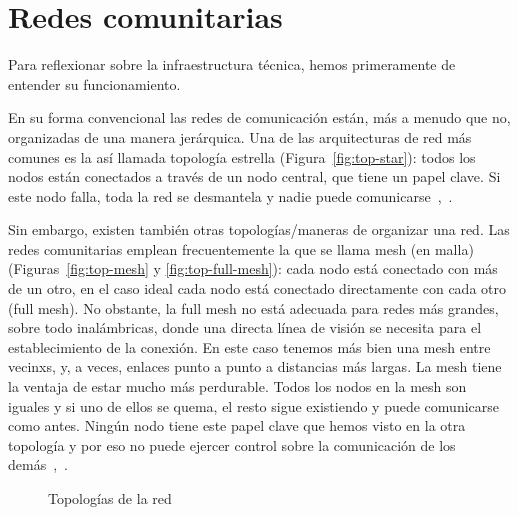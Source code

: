 \section{Redes comunitarias}
\label{cap:redes}

Para reflexionar sobre la infraestructura técnica, hemos primeramente de entender su funcionamiento.

En su forma convencional las redes de comunicación están, más a menudo que no, organizadas de una manera jerárquica.
Una de las arquitecturas de red más comunes es la así llamada topología estrella (Figura~\vref{fig:top-star}):
todos los nodos están conectados a través de un nodo central, que tiene un papel clave.
Si este nodo falla, toda la red se desmantela y nadie puede comunicarse~\autocite{Mabb2014},~\autocite{Medosch2004}.

Sin embargo, existen también otras topologías/maneras de organizar una red.
Las redes comunitarias emplean frecuentemente la que se llama mesh (en malla) (Figuras~\vref{fig:top-mesh} y \vref{fig:top-full-mesh}):
cada nodo está conectado con más de un otro, en el caso ideal cada nodo está conectado directamente con cada otro (full mesh).
No obstante, la full mesh no está adecuada para redes más grandes, sobre todo inalámbricas, donde una directa línea de visión se necesita para el establecimiento de la conexión.
En este caso tenemos más bien una mesh entre vecinxs, y, a veces, enlaces punto a punto a distancias más largas.
La mesh tiene la ventaja de estar mucho más perdurable.
Todos los nodos en la mesh son iguales y si uno de ellos se quema, el resto sigue existiendo y puede comunicarse como antes.
Ningún nodo tiene este papel clave que hemos visto en la otra topología y por eso no puede ejercer control sobre la comunicación de los demás~\autocite{FiTre2015},~\autocite{Medosch2004}.

\begin{figure}[b]
\centering
{} \quad
{} \quad
{}
\caption[Topologies]{Topologías de la red} %
\label{fig:topologies}
\end{figure}

